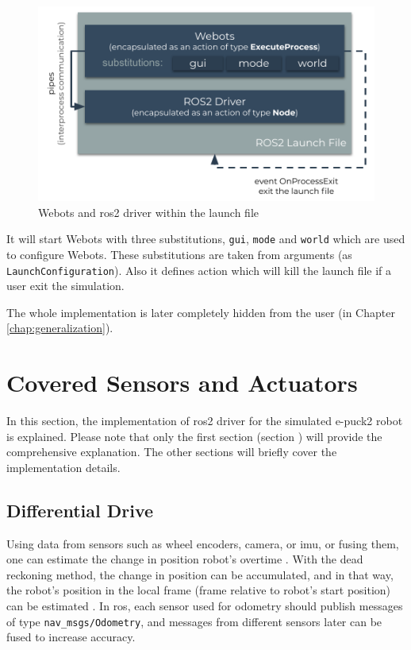 \begin{figure}[H]
    \centering
    \includegraphics[width=\textwidth]{simulation/figures/webots_launch.pdf}
    \caption{Webots and \ac{ros2} driver within the launch file}
    \label{fig:simulation:webots_launch}
\end{figure}

It will start Webots with three substitutions, \texttt{gui}, \texttt{mode} and \texttt{world} which are used to configure Webots. These substitutions are taken from arguments (as \texttt{LaunchConfiguration}). Also it defines action which will kill the launch file if a user exit the simulation.

The whole implementation is later completely hidden from the user (in Chapter \ref{chap:generalization}).


\section{Covered Sensors and Actuators}

In this section, the implementation of \ac{ros2} driver for the simulated e-puck2 robot is explained. Please note that only the first section (section \label{sec:simulation:odometry_velocity}) will provide the comprehensive explanation. The other sections will briefly cover the implementation details. 

\subsection{Differential Drive}
\label{sec:simulation:odometry_velocity}

Using data from sensors such as wheel encoders, camera, or \ac{imu}, or fusing them, one can estimate the change in position robot's overtime \cite{shen_localization_2011, nister_visual_2004}. With the dead reckoning method, the change in position can be accumulated, and in that way, the robot's position in the local frame (frame relative to robot's start position) can be estimated \cite{ben-ari_elements_2018, astolfi_exponential_1999}. In \ac{ros}, each sensor used for odometry should publish messages of type \texttt{nav\_msgs/Odometry}, and messages from different sensors later can be fused to increase accuracy. 

